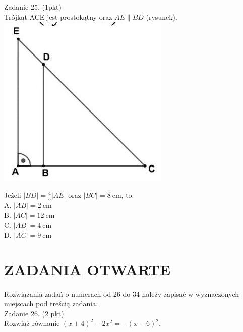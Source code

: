 \documentclass[10pt]{article}
\begin{document}
Zadanie 25. (1pkt)\\
Trójkąt ACE jest prostokątny oraz \(A E \| B D\) (rysunek).\\
\includegraphics[max width=\textwidth, center]{2024_11_21_23d228cacd5e4a9a3f86g-06(2)}

Jeżeli \(|B D|=\frac{4}{5}|A E|\) oraz \(|B C|=8 \mathrm{~cm}\), to:\\
A. \(|A B|=2 \mathrm{~cm}\)\\
B. \(|A C|=12 \mathrm{~cm}\)\\
C. \(|A B|=4 \mathrm{~cm}\)\\
D. \(|A C|=9 \mathrm{~cm}\)

\section*{ZADANIA OTWARTE}
Rozwiązania zadań o numerach od 26 do 34 należy zapisać w wyznaczonych miejscach pod treścią zadania.\\
Zadanie 26. (2 pkt)\\
Rozwiąż równanie \((x+4)^{2}-2 x^{2}=-(x-6)^{2}\).
\end{document}
